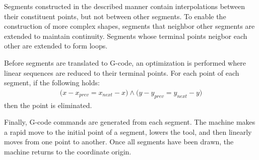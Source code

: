 Segments constructed in the described manner contain interpolations between
their constituent points, but not between other segments. To enable the
construction of more complex shapes, segments that neighbor other segments are
extended to maintain continuity. Segments whose terminal points neigbor each
other are extended to form loops.

Before segments are translated to G-code, an optimization is performed where
linear sequences are reduced to their terminal points. For each point of each
segment, if the following holds:
\begin{align*}
    \big(x - x_{prev} = x_{next} - x\big)
    \land
    \big(y - y_{prev} = y_{next} - y\big)
\end{align*}
then the point is eliminated.

Finally, G-code commands are generated from each segment. The machine makes a
rapid move to the initial point of a segment, lowers the tool, and then linearly
moves from one point to another. Once all segments have been drawn, the machine
returns to the coordinate origin.
